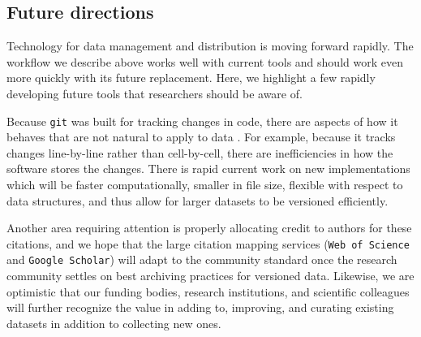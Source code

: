 \documentclass[a4paper,11pt]{article}
\begin{document}
\subsection{Future directions}

Technology for data management and distribution is moving forward rapidly.  The workflow we describe above works well with current tools and should work even more quickly with its future replacement.  Here, we highlight a few rapidly developing future tools that researchers should be aware of.

Because \texttt{git} was built for tracking changes in code, there are aspects of how it behaves that are not natural to apply to  data \cite{Perkel-2016}.  For example, because it tracks changes line-by-line rather than cell-by-cell, there are inefficiencies in how the software stores the changes.
There is rapid current work on new implementations which will be faster computationally, smaller in file size, flexible with respect to data structures, and thus allow for larger datasets to be versioned efficiently\citep{Fli, Dat}.

Another area requiring attention is properly allocating credit to authors for these citations, and we hope that the large citation mapping services (\texttt{Web of Science} and \texttt{Google Scholar}) will adapt to the community standard once the research community settles on best archiving practices for versioned data. Likewise, we are optimistic that our funding bodies, research institutions, and scientific colleagues will further recognize the value in adding to, improving, and curating existing datasets in addition to collecting new ones.


\end{document}
